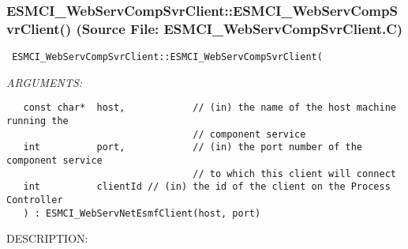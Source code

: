  
\setlength{\oldparskip}{\parskip}
\setlength{\parskip}{1.5ex}
\setlength{\oldparindent}{\parindent}
\setlength{\parindent}{0pt}
\setlength{\oldbaselineskip}{\baselineskip}
\setlength{\baselineskip}{11pt}
 
\def\bv{\begin{verbatim}}
\def\ev{\end{verbatim}}
\def\be{\begin{equation}}
\def\ee{\end{equation}}
\def\bea{\begin{eqnarray}}
\def\eea{\end{eqnarray}}
\def\bi{\begin{itemize}}
\def\ei{\end{itemize}}
\def\bn{\begin{enumerate}}
\def\en{\end{enumerate}}
\def\bd{\begin{description}}
\def\ed{\end{description}}
\def\({\left (}
\def\){\right )}
\def\[{\left [}
\def\]{\right ]}
\def\<{\left  \langle}
\def\>{\right \rangle}
\def\cI{{\cal I}}
\def\diag{\mathop{\rm diag}}
\def\tr{\mathop{\rm tr}}


 
\subsubsection{ESMCI\_WebServCompSvrClient::ESMCI\_WebServCompSvrClient() (Source File: ESMCI\_WebServCompSvrClient.C)}


  
\begin{verbatim} ESMCI_WebServCompSvrClient::ESMCI_WebServCompSvrClient(\end{verbatim}{\em ARGUMENTS:}
\begin{verbatim}   const char*  host,            // (in) the name of the host machine running the
                                 // component service
   int          port,            // (in) the port number of the component service
                                 // to which this client will connect
   int          clientId // (in) the id of the client on the Process Controller
   ) : ESMCI_WebServNetEsmfClient(host, port)\end{verbatim}
{\sf DESCRIPTION:\\ }


